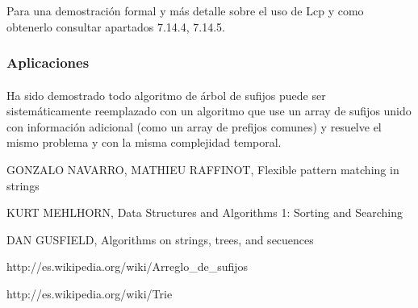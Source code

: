 \documentclass[es]{ifirak}
\begin{document}
Para una demostración formal y más detalle sobre el uso de Lcp y como obtenerlo consultar \cite{key-3} apartados 7.14.4, 7.14.5.
\subsubsection{Aplicaciones}
\paragraph{}
Ha sido demostrado todo algoritmo de árbol de sufijos puede ser sistemáticamente reemplazado con un algoritmo que use un array de sufijos unido con información adicional (como un array de prefijos comunes) y resuelve el mismo problema y con la misma complejidad temporal.
\pagebreak

\begin{thebibliography}{arauak}
	
	 GONZALO NAVARRO, MATHIEU RAFFINOT, Flexible pattern matching in strings
	
	 KURT MEHLHORN, Data Structures and Algorithms 1: Sorting and Searching
	
	 DAN GUSFIELD, Algorithms on strings, trees, and secuences
	
	 http://es.wikipedia.org/wiki/Arreglo\_de\_sufijos
	
	 http://es.wikipedia.org/wiki/Trie
	
\end{thebibliography}
\end{document}

